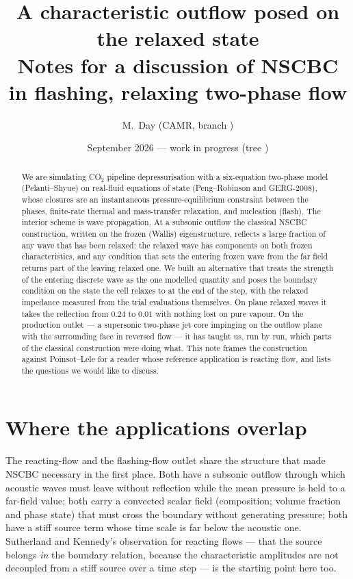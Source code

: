 \documentclass[11pt,a4paper]{article}
\title{A characteristic outflow posed on the relaxed state\\
\large Notes for a discussion of NSCBC in flashing, relaxing two-phase flow}
\author{M.~Day \quad (CAMR, branch \code{co2-eos})}
\date{September 2026 --- work in progress (tree \code{7abcc31})}
\begin{document}
\maketitle

\begin{abstract}
\noindent
We are simulating CO$_2$ pipeline depressurisation with a six-equation
two-phase model (Pelanti--Shyue) on real-fluid equations of state
(Peng--Robinson and GERG-2008), whose closures are an instantaneous
pressure-equilibrium constraint between the phases, finite-rate thermal
and mass-transfer relaxation, and nucleation (flash).  The
interior scheme is wave propagation.  At a subsonic outflow the
classical NSCBC construction, written on the frozen (Wallis)
eigenstructure, reflects a large fraction of any wave that has been
relaxed: the relaxed wave has components on both frozen
characteristics, and any condition that sets the entering frozen wave
from the far field returns part of the leaving relaxed one.  We built an
alternative that treats the strength of the entering discrete wave as
the one modelled quantity and poses the boundary condition on the state
the cell relaxes to at the end of the step, with the relaxed impedance
measured from the trial evaluations themselves.  On plane relaxed waves
it takes the reflection from $0.24$ to $0.01$ with nothing lost on pure
vapour.  On the production outlet --- a supersonic two-phase jet core
impinging on the outflow plane with the surrounding face in reversed
flow --- it has taught us, run by run, which parts of the classical
construction were doing what.  This note frames the construction against
Poinsot--Lele for a reader whose reference application is reacting flow,
and lists the questions we would like to discuss.
\end{abstract}

\section{Where the applications overlap}

The reacting-flow and the flashing-flow outlet share the structure that
made NSCBC necessary in the first place.  Both have a subsonic outflow
through which acoustic waves must leave without reflection while the
mean pressure is held to a far-field value; both carry a convected
scalar field (composition; volume fraction and phase state) that must
cross the boundary without generating pressure; both have a stiff source
term whose time scale is far below the acoustic one.  Sutherland and
Kennedy's observation for reacting flows --- that the source belongs
\emph{in} the boundary relation, because the characteristic amplitudes
are not decoupled from a stiff source over a time step --- is the
starting point here too.
\end{document}
